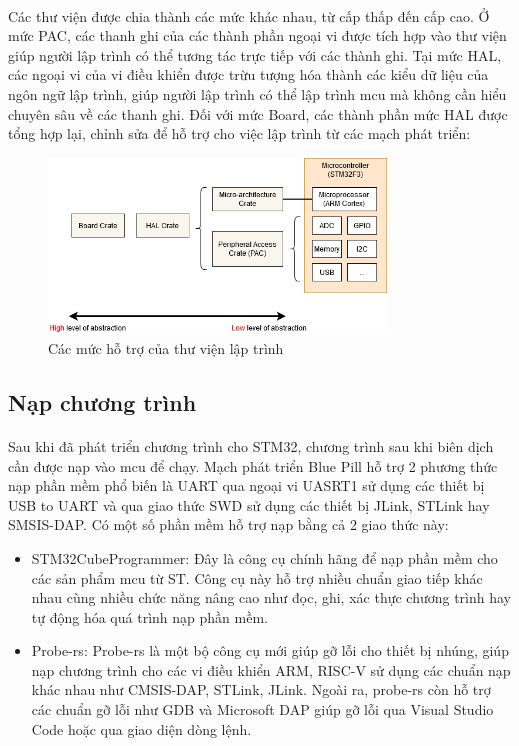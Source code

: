 \paragraph{}
Các thư viện được chia thành các mức khác nhau, từ cấp thấp đến cấp cao. Ở mức PAC, các thanh ghi của các thành phần ngoại vi được tích hợp vào thư viện giúp người lập trình có thể tương tác trực tiếp với các thành ghi. Tại mức HAL, các ngoại vi của vi điều khiển được trừu tượng hóa thành các kiểu dữ liệu của ngôn ngữ lập trình, giúp người lập trình có thể lập trình \acrlong{mcu} mà không cần hiểu chuyên sâu về các thanh ghi. Đối với mức Board, các thành phần mức HAL được tổng hợp lại, chỉnh sửa để hỗ trợ cho việc lập trình từ các mạch phát triển:
\begin{figure}[H]
    \centering
    \includegraphics[width=0.8\textwidth]{images/crates.png}
    \caption{Các mức hỗ trợ của thư viện lập trình}
    \label{fig:embedded-library}
\end{figure}
\subsection{Nạp chương trình}
\paragraph{}
Sau khi đã phát triển chương trình cho STM32, chương trình sau khi biên dịch cần được nạp vào \acrshort{mcu} để chạy. Mạch phát triển Blue Pill hỗ trợ 2 phương thức nạp phần mềm phổ biến là UART qua ngoại vi UASRT1 sử dụng các thiết bị USB to UART và qua giao thức SWD sử dụng các thiết bị JLink, STLink hay SMSIS-DAP. Có một số phần mềm hỗ trợ nạp bằng cả 2 giao thức này:
\begin{itemize}
    \item STM32CubeProgrammer: Đây là công cụ chính hãng để nạp phần mềm cho các sản phẩm \acrlong{mcu} từ ST. Công cụ này hỗ trợ nhiều chuẩn giao tiếp khác nhau cùng nhiều chức năng nâng cao như đọc, ghi, xác thực chương trình hay tự động hóa quá trình nạp phần mềm.
    \item Probe-rs: Probe-rs là một bộ công cụ mới giúp gỡ lỗi cho thiết bị nhúng, giúp nạp chương trình cho các vi điều khiển ARM, RISC-V sử dụng các chuẩn nạp khác nhau như CMSIS-DAP, STLink, JLink. Ngoài ra, probe-rs còn hỗ trợ các chuẩn gỡ lỗi như GDB và Microsoft DAP giúp gỡ lỗi qua Visual Studio Code hoặc qua giao diện dòng lệnh.
\end{itemize}
